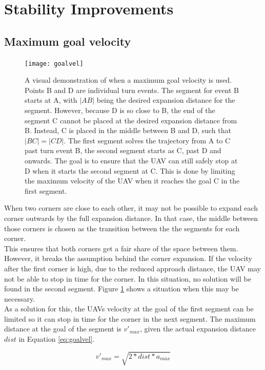 \section{Stability Improvements}

\subsection{Maximum goal velocity}
\label{subsec:maxgoalvel}
\begin{figure}[]
	\centering
	\texttt{[image: goalvel]}
	\caption[A scenario in which a maximum goal velocity is useful.]{A visual demonstration of when a maximum goal velocity is used. Points B and D are individual turn events. The segment for event B starts at A, with $|AB|$ being the desired expansion distance for the segment. However, because D is so close to B, the end of the segment C cannot be placed at the desired expansion distance from B. Instead, C is placed in the middle between B and D, such that $|BC|=|CD|$. The first segment solves the trajectory from A to C past turn event B, the second segment starts as C, past D and onwards. The goal is to ensure that the UAV can still safely stop at D when it starts the second segment at C. This is done by limiting the maximum velocity of the UAV when it reaches the goal C in the first segment.}
	\label{fig:max-goal-vel}
\end{figure}

When two corners are close to each other, it may not be possible to expand each corner outwards by the full expansion distance. In that case, the middle between those corners is chosen as the transition between the the segments for each corner. \\
This ensures that both corners get a fair share of the space between them. However, it breaks the assumption behind the corner expansion. If the velocity after the first corner is high, due to the reduced approach distance, the UAV may not be able to stop in time for the corner. In this situation, no solution will be found in the second segment. Figure \ref{fig:max-goal-vel} shows a situation when this may be necessary.\\
As a solution for this, the UAVs velocity at the goal of the first segment can be limited so it can stop in time for the corner in the next segment. The maximum distance at the goal of the segment is $v'_{max}$, given the actual expansion distance $dist$ in Equation \ref{eq:goalvel}. 

\begin{equation}
\label{eq:goalvel}
v'_{max} = \sqrt{2 * dist * a_{max}}
\end{equation}

